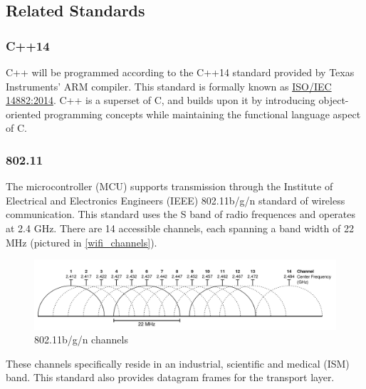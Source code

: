 \subsection{Related Standards}
\subsubsection{C++14} C++ will be programmed according to the C++14 standard provided by Texas Instruments' ARM compiler. This standard is formally known as
\href{https://www.iso.org/standard/64029.html}{ISO/IEC 14882:2014}. C++ is
a superset of C, and builds upon it by introducing object-oriented
programming concepts while maintaining the functional language aspect of C.

\subsubsection{802.11} The microcontroller (MCU) supports transmission through the Institute of
Electrical and Electronics Engineers (IEEE) 802.11b/g/n standard of wireless
communication. This standard uses the S band of radio frequences and
operates at 2.4 GHz. There are 14 accessible channels, each spanning a band
width of 22 MHz (pictured in \autoref{wifi_channels}).
\begin{figure}[H]
    \caption{802.11b/g/n channels \cite{Flickenger}}
    \label{wifi_channels}
    \centering
    \includegraphics[width=\textwidth]{images/wifi_channels.png}
\end{figure}
These channels specifically reside in an industrial, scientific and medical
(ISM) band. This standard also provides datagram frames for the transport
layer.

